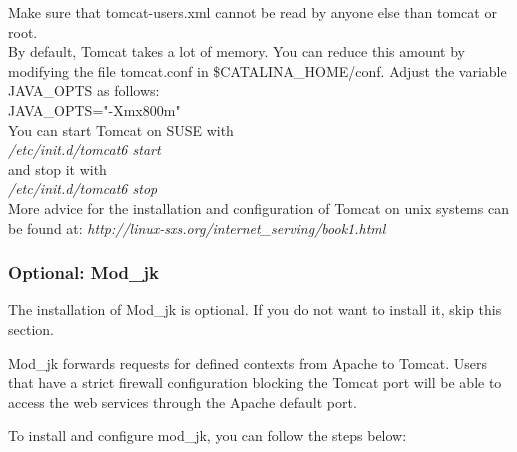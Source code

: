 \documentclass{book}
\begin{document}
Make sure that tomcat-users.xml cannot be read by anyone else than tomcat or root.\\

By default, Tomcat takes a lot of memory. You can reduce this amount by
modifying the file tomcat.conf in \$CATALINA\_HOME/conf.
Adjust the variable JAVA\_OPTS as follows:\\
JAVA\_OPTS="-Xmx800m"\\

You can start Tomcat on SUSE with\\
 \textit{/etc/init.d/tomcat6 start}\\
and stop it with\\
 \textit{/etc/init.d/tomcat6 stop}\\

More advice for the installation and configuration of Tomcat on unix systems
can be found at: \textit{http://linux-sxs.org/internet\_serving/book1.html}

\subsubsection{Optional: Mod\_jk}

The installation of Mod\_jk is optional. If you do not want to install it,
skip this section.

Mod\_jk forwards requests for defined contexts from Apache to Tomcat.
Users that have a strict firewall configuration blocking the Tomcat port
will be able to access the web services through the Apache default port.

To install and configure mod\_jk, you can follow the steps below:
\end{document}
